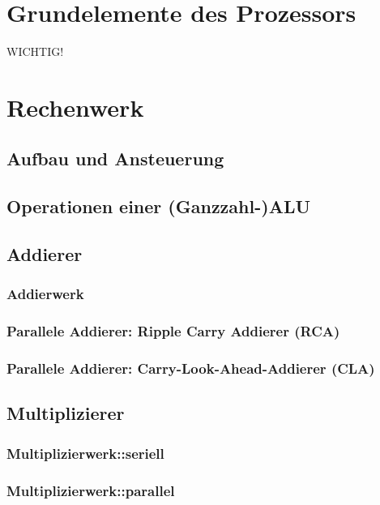 
\section*{Grundelemente des Prozessors} WICHTIG!
\section{Rechenwerk}
\subsection*{Aufbau und Ansteuerung}
\subsection*{Operationen einer (Ganzzahl-)ALU}

\subsection{Addierer}
\subsubsection*{Addierwerk}
\subsubsection*{Parallele Addierer: Ripple Carry Addierer (RCA)}
\subsubsection*{Parallele Addierer: Carry-Look-Ahead-Addierer (CLA)}

\subsection{Multiplizierer}

\subsubsection{Multiplizierwerk::seriell}
\subsubsection{Multiplizierwerk::parallel}

